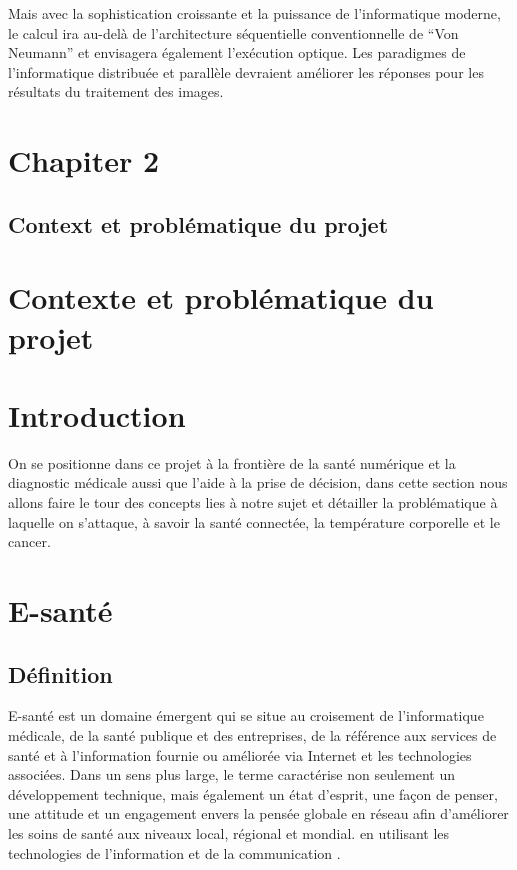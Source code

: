 \documentclass[12pt]{article}
\begin{document}
Mais avec la sophistication croissante et la puissance de l'informatique moderne, le calcul ira au-delà de l'architecture séquentielle conventionnelle de “Von Neumann” et envisagera également l'exécution optique. Les paradigmes de l'informatique distribuée et parallèle devraient améliorer les réponses pour les résultats du traitement des images.
\newpage
\rhead{}
\section*{\Huge{Chapiter 2}}
\subsection*{\huge{Context et problématique du projet}}
\newpage
{}
\section*{Contexte et problématique du projet}

\section{Introduction}
On se positionne dans ce projet à la frontière de la santé numérique et la diagnostic médicale aussi que l'aide à la prise de décision, dans cette section nous allons faire le tour des concepts lies à notre sujet et détailler la problématique à laquelle on s'attaque, à savoir la santé connectée, la température corporelle et le cancer.  
\section{E-santé}
\subsection{Définition}
E-santé est un domaine émergent qui se situe au croisement de l'informatique médicale, de la santé publique et des entreprises, de la référence aux services de santé et à l'information fournie ou améliorée via Internet et les technologies associées. Dans un sens plus large, le terme caractérise non seulement un développement technique, mais également un état d'esprit, une façon de penser, une attitude et un engagement envers la pensée globale en réseau afin d'améliorer les soins de santé aux niveaux local, régional et mondial. en utilisant les technologies de l'information et de la communication \cite{26}.
\end{document}
